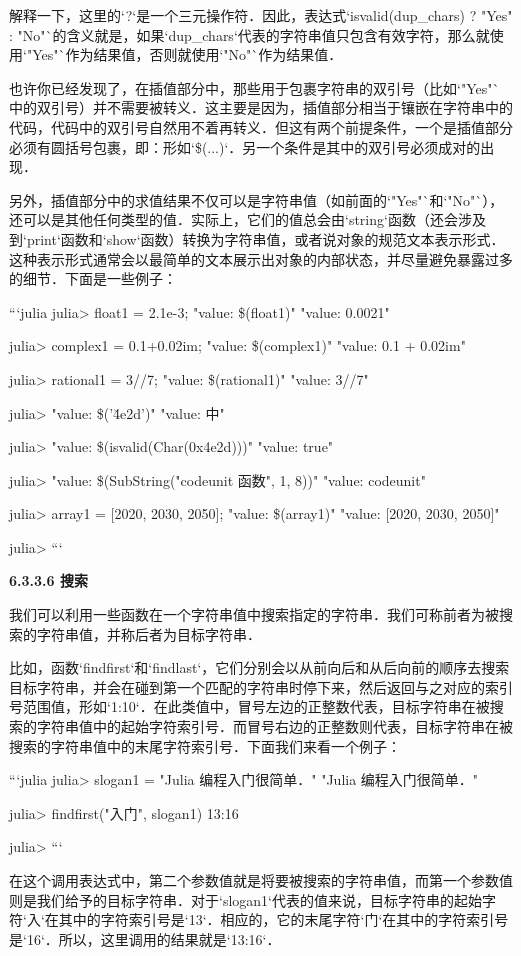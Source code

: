 解释一下，这里的`?`是一个三元操作符．因此，表达式`isvalid(dup_chars) ? "Yes" : "No"`的含义就是，如果`dup_chars`代表的字符串值只包含有效字符，那么就使用`"Yes"`作为结果值，否则就使用`"No"`作为结果值．

也许你已经发现了，在插值部分中，那些用于包裹字符串的双引号（比如`"Yes"`中的双引号）并不需要被转义．这主要是因为，插值部分相当于镶嵌在字符串中的代码，代码中的双引号自然用不着再转义．但这有两个前提条件，一个是插值部分必须有圆括号包裹，即：形如`\$(...)`．另一个条件是其中的双引号必须成对的出现．

另外，插值部分中的求值结果不仅可以是字符串值（如前面的`"Yes"`和`"No"`），还可以是其他任何类型的值．实际上，它们的值总会由`string`函数（还会涉及到`print`函数和`show`函数）转换为字符串值，或者说对象的规范文本表示形式．这种表示形式通常会以最简单的文本展示出对象的内部状态，并尽量避免暴露过多的细节．下面是一些例子：

```julia
julia> float1 = 2.1e-3; "value: \$(float1)"
"value: 0.0021"

julia> complex1 = 0.1+0.02im; "value: \$(complex1)"
"value: 0.1 + 0.02im"

julia> rational1 = 3//7; "value: \$(rational1)"
"value: 3//7"

julia> "value: \$('\u4e2d')"
"value: 中"

julia> "value: \$(isvalid(Char(0x4e2d)))"
"value: true"

julia> "value: \$(SubString("codeunit 函数", 1, 8))"
"value: codeunit"

julia> array1 = [2020, 2030, 2050]; "value: \$(array1)"
"value: [2020, 2030, 2050]"

julia> 
```

\textbf{6.3.3.6 搜索}

我们可以利用一些函数在一个字符串值中搜索指定的字符串．我们可称前者为被搜索的字符串值，并称后者为目标字符串．

比如，函数`findfirst`和`findlast`，它们分别会以从前向后和从后向前的顺序去搜索目标字符串，并会在碰到第一个匹配的字符串时停下来，然后返回与之对应的索引号范围值，形如`1:10`．在此类值中，冒号左边的正整数代表，目标字符串在被搜索的字符串值中的起始字符索引号．而冒号右边的正整数则代表，目标字符串在被搜索的字符串值中的末尾字符索引号．下面我们来看一个例子：

```julia
julia> slogan1 = "Julia 编程入门很简单．"
"Julia 编程入门很简单．"

julia> findfirst("入门", slogan1)
13:16

julia> 
```

在这个调用表达式中，第二个参数值就是将要被搜索的字符串值，而第一个参数值则是我们给予的目标字符串．对于`slogan1`代表的值来说，目标字符串的起始字符`入`在其中的字符索引号是`13`．相应的，它的末尾字符`门`在其中的字符索引号是`16`．所以，这里调用的结果就是`13:16`．


